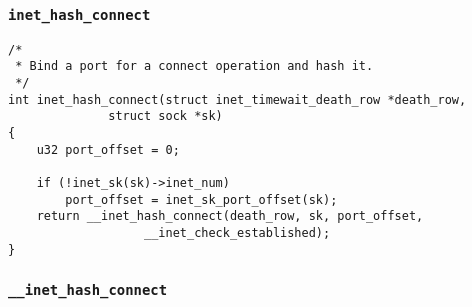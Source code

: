            \subsubsection{\texttt{inet_hash_connect}}
\begin{verbatim}
/*
 * Bind a port for a connect operation and hash it.
 */
int inet_hash_connect(struct inet_timewait_death_row *death_row,
              struct sock *sk)
{
    u32 port_offset = 0;

    if (!inet_sk(sk)->inet_num)
        port_offset = inet_sk_port_offset(sk);
    return __inet_hash_connect(death_row, sk, port_offset,
                   __inet_check_established);
}
\end{verbatim}

        \subsubsection{\texttt{__inet_hash_connect}}     
